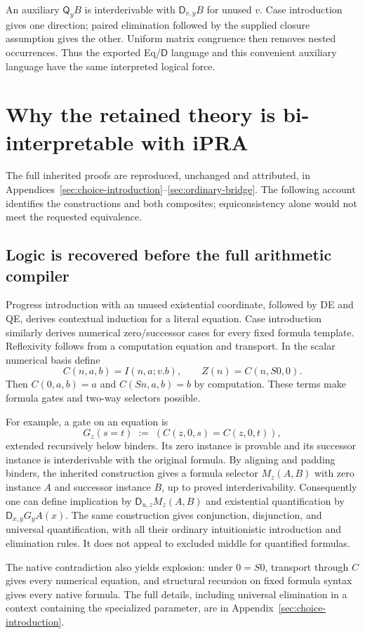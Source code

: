 \documentclass[11pt,letterpaper]{article}
\theoremstyle{definition}\newtheorem{definition}[theorem]{Definition}
\theoremstyle{remark}\newtheorem{remark}[theorem]{Remark}
\newcommand{\Q}{\mathsf Q}
\newcommand{\D}{\mathsf D}
\begin{document}
An auxiliary $\Q_y B$ is interderivable with
$\D_{v,y}B$ for unused $v$. Case introduction gives one direction;
paired elimination followed by the supplied closure assumption gives
the other. Uniform matrix congruence then removes nested occurrences.
Thus the exported Eq/$\D$ language and this convenient auxiliary
language have the same interpreted logical force.

\section{Why the retained theory is bi-interpretable with iPRA}
\label{sec:bridge}

The full inherited proofs are reproduced, unchanged and attributed, in
Appendices~\ref{sec:choice-introduction}--\ref{sec:ordinary-bridge}.
The following account identifies the constructions and both composites;
equiconsistency alone would not meet the requested equivalence.

\subsection{Logic is recovered before the full arithmetic compiler}

Progress introduction with an unused existential coordinate, followed
by DE and QE, derives contextual induction for a literal equation.
Case introduction similarly derives numerical zero/successor cases for
every fixed formula template. Reflexivity follows from a computation
equation and transport. In the scalar numerical basis define
\[
 C(n,a,b)=I(n,a;v.b),\qquad Z(n)=C(n,S0,0).
\]
Then $C(0,a,b)=a$ and $C(Sn,a,b)=b$ by computation.
These terms make formula gates and two-way selectors possible.

For example, a gate on an equation is
\[
 G_z(s=t)\;:=\;(C(z,0,s)=C(z,0,t)),
\]
extended recursively below binders. Its zero instance is provable and
its successor instance is interderivable with the original formula.
By aligning and padding binders, the inherited construction gives a
formula selector $M_z(A,B)$ with zero instance $A$ and successor
instance $B$, up to proved interderivability. Consequently one can
define implication by $\D_{u,z}M_z(A,B)$ and existential
quantification by $\D_{x,y}G_yA(x)$. The same construction gives
conjunction, disjunction, and universal quantification, with all their
ordinary intuitionistic introduction and elimination rules. It does
not appeal to excluded middle for quantified formulas.

The native contradiction also yields explosion: under $0=S0$,
transport through $C$ gives every numerical equation, and structural
recursion on fixed formula syntax gives every native formula. The full
details, including universal elimination in a context containing the
specialized parameter, are in Appendix~\ref{sec:choice-introduction}.
\end{document}
